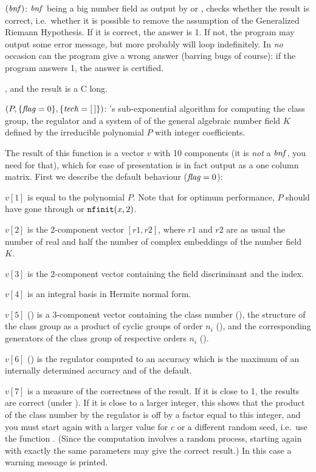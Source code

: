 \smallskip
{}$(\hbox{\it bnf\/})$: $\hbox{\it bnf\/}$ being a big number field
as output by  or , checks whether the result
is correct, i.e.~whether it is possible to remove the assumption of the
Generalized Riemann Hypothesis. If it is correct, the answer is 1.
If not, the program may output some error message, but more probably will loop
indefinitely. In \emph{no} occasion can the program give a wrong answer
(barring bugs of course): if the program answers 1, the answer is certified.

, and the result is a C long.

$(P,\{\hbox{\it f\kern0pt lag\/}=0\},\{\hbox{\it tech\/}=[\,]\})$: 's
sub-exponential algorithm for computing the class group, the regulator and a
system of  of the general algebraic number field $K$
defined by the irreducible polynomial $P$ with integer coefficients.

The result of this function is a vector $v$ with 10 components (it is
\emph{not} a $\hbox{\it bnf\/}$, you need  for that), which for ease of
presentation is in fact output as a one column matrix. First we describe the
default behaviour ($\hbox{\it f\kern0pt lag\/}=0$):

 $v[1]$ is equal to the polynomial $P$. Note that for optimum performance,
$P$ should have gone through  or ${\tt nfinit}(x,2)$.

 $v[2]$ is the 2-component vector $[r1,r2]$, where $r1$ and $r2$ are as usual
the number of real and half the number of complex embeddings of the number
field $K$.

 $v[3]$ is the 2-component vector containing the field discriminant and the
index.

 $v[4]$ is an integral basis in Hermite normal form.

 $v[5]$ () is a 3-component vector containing the class number
(), the structure of the class group as a product of cyclic
groups of order $n_i$ (), and the corresponding generators
of the class group of respective orders $n_i$ ().

 $v[6]$ () is the regulator computed to an accuracy which is the
maximum of an internally determined accuracy and of the default.

 $v[7]$ is a measure of the correctness of the result. If it is close to 1,
the results are correct (under ). If it is close to a larger integer,
this shows that the product of the class number by the regulator is off by a
factor equal to this integer, and you must start again with a larger value
for $c$ or a different random seed, i.e.~use the function .
(Since the computation involves a random process, starting again with exactly
the same parameters may give the correct result.) In this case a warning
message is printed.

